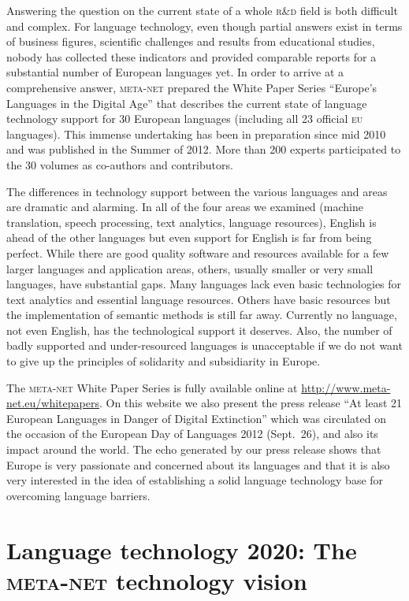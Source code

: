\documentclass[output=paper]{LSP/langsci}
\begin{document}
Answering the question on the current state of a whole \textsc{r}\&\textsc{d} field is
both difficult and complex. For language technology, even though
partial answers exist in terms of business figures, scientific
challenges and results from educational studies, nobody has collected
these indicators and provided comparable reports for a substantial
number of European languages yet. In order to arrive at a
comprehensive answer, \textsc{meta-net} prepared the White Paper Series
``Europe's Languages in the Digital Age'' \citep{LWP2012} that
describes the current state of language technology support for 30
European languages (including all 23 official \textsc{eu} languages). This
immense undertaking has been in preparation since mid 2010 and was
published in the Summer of 2012. More than 200 experts participated to
the 30 volumes as co-authors and contributors.

The differences in technology support between the various languages
and areas are dramatic and alarming. In all of the four areas we
examined (machine translation, speech processing, text analytics,
language resources), English is ahead of the other languages but even
support for English is far from being perfect. While there are good
quality software and resources available for a few larger languages
and application areas, others, usually smaller or very small
languages, have substantial gaps. Many languages lack even basic
technologies for text analytics and essential language
resources. Others have basic resources but the implementation of
semantic methods is still far away. Currently no language, not even
English, has the technological support it deserves. Also, the number
of badly supported and under-resourced languages is unacceptable if we
do not want to give up the principles of solidarity and subsidiarity
in Europe.

\newpage 
The \textsc{meta-net} White Paper Series is fully available online at
\url{http://www.meta-net.eu/whitepapers}. On this website we also
present the press release ``At least 21 European Languages in Danger
of Digital Extinction'' which was circulated on the occasion of the
European Day of Languages 2012 (Sept.~26), and also its impact around
the world. The echo generated by our press release shows that Europe
is very passionate and concerned about its languages and that it is
also very interested in the idea of establishing a solid language
technology base for overcoming language barriers.

\section{Language technology 2020: The \textsc{meta-net} technology vision}
\label{sec:lang-techn-2020}
\end{document}

